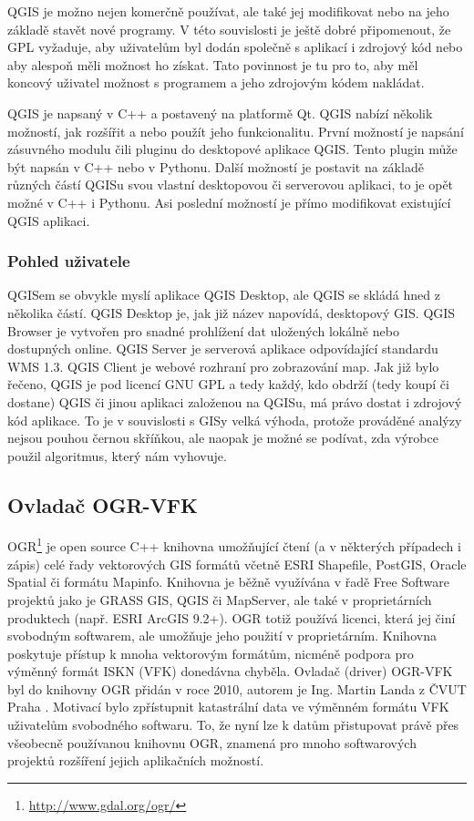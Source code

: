 \documentclass[a4paper,10pt]{article}
\begin{document}
QGIS je možno nejen komerčně používat, ale také jej modifikovat nebo na jeho základě stavět nové programy.
V této souvislosti je ještě dobré připomenout, že GPL vyžaduje, aby uživatelům byl dodán společně s aplikací i zdrojový kód nebo aby alespoň měli možnost ho získat.
Tato povinnost je tu pro to, aby měl koncový uživatel možnost s programem a jeho zdrojovým kódem nakládat.

QGIS je napsaný v C++ a postavený na platformě Qt.
QGIS nabízí několik možností, jak rozšířit a nebo použít jeho funkcionalitu.
První možností je napsání zásuvného modulu čili pluginu do desktopové aplikace QGIS.
Tento plugin může být napsán v C++ nebo v Pythonu.
Další možností je postavit na základě různých částí QGISu svou vlastní desktopovou či serverovou aplikaci, to je opět možné v C++ i Pythonu.
Asi poslední možností je přímo modifikovat existující QGIS aplikaci.

\subsubsection{Pohled uživatele}

QGISem se obvykle myslí aplikace QGIS Desktop, ale QGIS se skládá hned z několika částí.
QGIS Desktop je, jak již název napovídá, desktopový GIS.
QGIS Browser je vytvořen pro snadné prohlížení dat uložených lokálně nebo dostupných online.
QGIS Server je serverová aplikace odpovídající standardu WMS 1.3.
QGIS Client je webové rozhraní pro zobrazování map.
Jak již bylo řečeno, QGIS je pod licencí GNU GPL a tedy každý, kdo obdrží (tedy koupí či dostane) QGIS či jinou aplikaci založenou na QGISu, má právo dostat i zdrojový kód aplikace.
To je v souvislosti s GISy velká výhoda, protože prováděné analýzy nejsou pouhou černou skříňkou,
ale naopak je možné se podívat, zda výrobce použil algoritmus, který nám vyhovuje.

\subsection{Ovladač OGR-VFK}
OGR\footnote{\url{http://www.gdal.org/ogr/}} je open source C++ knihovna umožňující čtení (a v některých případech i zápis)
celé řady vektorových GIS formátů včetně ESRI Shapefile, PostGIS, Oracle Spatial či formátu Mapinfo.
Knihovna je běžně využívána v řadě Free Software projektů jako je GRASS GIS, QGIS či MapServer, ale také v proprietárních produktech (např. ESRI ArcGIS 9.2+).
OGR totiž používá licenci, která jej činí svobodným softwarem, ale umožňuje jeho použití v proprietárním.
Knihovna poskytuje přístup k mnoha vektorovým formátům, nicméně podpora pro výměnný formát ISKN (VFK) donedávna chyběla.
Ovladač (driver) OGR-VFK byl do knihovny OGR přidán v roce 2010, autorem je Ing. Martin Landa z ČVUT Praha \cite{vfkDriver}.
Motivací bylo zpřístupnit katastrální data ve výměnném formátu VFK uživatelům svobodného softwaru.
To, že nyní lze k datům přistupovat právě přes všeobecně používanou knihovnu OGR, znamená pro mnoho softwarových projektů rozšíření jejich aplikačních možností.
\end{document}
